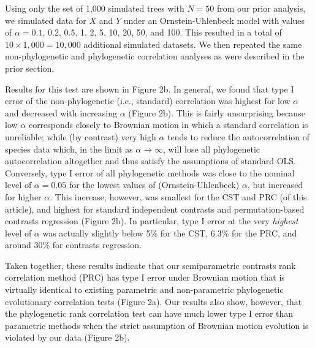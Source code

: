\documentclass[fleqn,10pt,lineno]{wlpeerj} %
\begin{document}
Using only the set of 1,000 simulated trees with \(N=50\) from our prior analysis, we simulated data for \(X\) and \(Y\) under an Ornstein-Uhlenbeck model with values of \(\alpha = 0.1\), 0.2, 0.5, 1, 2, 5, 10, 20, 50, and 100. This resulted in a total of \(10 \times 1,000 = 10,000\) additional simulated datasets. We then repeated the same non-phylogenetic and phylogenetic correlation analyses as were described in the prior section.

Results for this test are shown in Figure 2b. In general, we found that type I error of the non-phylogenetic (i.e., standard) correlation was highest for low \(\alpha\) and decreased with increasing \(\alpha\) (Figure 2b). This is fairly unsurprising because low \(\alpha\) corresponds closely to Brownian motion in which a standard correlation is unreliable; while (by contrast) very high \(\alpha\) tends to reduce the autocorrelation of species data which, in the limit as \(\alpha \rightarrow \infty\), will lose all phylogenetic autocorrelation altogether and thus satisfy the assumptions of standard OLS. Conversely, type I error of all phylogenetic methods was close to the nominal level of \(\alpha = 0.05\) for the lowest values of (Ornstein-Uhlenbeck) \(\alpha\), but increased for higher \(\alpha\). This increase, however, was smallest for the CST and PRC (of this article), and highest for standard independent contrasts and permutation-based contrasts regression (Figure 2b). In particular, type I error at the very \emph{highest} level of \(\alpha\) was actually slightly below 5\% for the CST, 6.3\% for the PRC, and around 30\% for contrasts regression.

Taken together, these results indicate that our semiparametric contrasts rank correlation method (PRC) has type I error under Brownian motion that is virtually identical to existing parametric and non-parametric phylogenetic evolutionary correlation tests (Figure 2a). Our results also show, however, that the phylogenetic rank correlation test can have much lower type I error than parametric methods when the strict assumption of Brownian motion evolution is violated by our data (Figure 2b).
\end{document}
